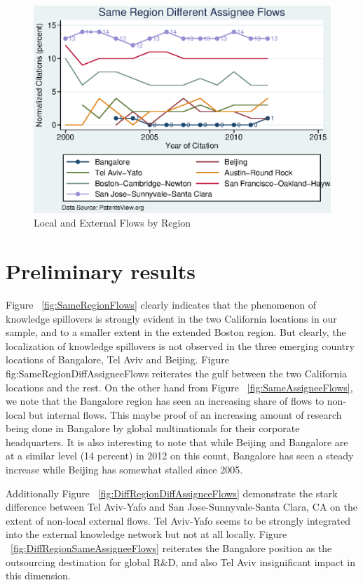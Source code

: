 \documentclass[12pt]{article}
\begin{document}
\begin{figure}[h]
\begin{centering}
  \includegraphics[width=\textwidth]{SameRegionDiffAssigneeFlows}
  \caption{Local and External Flows by Region}
  \label{fig:SameRegionDiffAssigneeFlows}
\end{centering}
\end{figure}

\section{Preliminary results}
Figure ~\ref{fig:SameRegionFlows} clearly indicates that the phenomenon of knowledge spillovers is strongly evident in the two California locations in our sample, and to a smaller extent in the extended Boston region. But clearly, the localization of knowledge spillovers is not observed in the three emerging country locations of Bangalore, Tel Aviv and Beijing. Figure {fig:SameRegionDiffAssigneeFlows} reiterates the gulf between the two California locations and the rest. On the other hand from Figure ~\ref{fig:SameAssigneeFlows}, we note that the Bangalore region has seen an increasing share of flows to non-local but internal flows. This maybe proof of an increasing amount of research being done in Bangalore by global multinationals for their corporate headquarters. It is also interesting to note that while Beijing and Bangalore are at a similar level (14 percent) in 2012 on this count, Bangalore has seen a steady increase while Beijing has somewhat stalled since 2005.

Additionally Figure ~\ref{fig:DiffRegionDiffAssigneeFlows} demonstrate the stark difference between Tel Aviv-Yafo and San Jose-Sunnyvale-Santa Clara, CA on the extent of non-local external flows. Tel Aviv-Yafo seems to be strongly integrated into the external knowledge network but not at all locally. Figure ~\ref{fig:DiffRegionSameAssigneeFlows} reiterates the Bangalore position as the outsourcing destination for global R\&D, and also Tel Aviv insignificant impact in this dimension.
\end{document}
